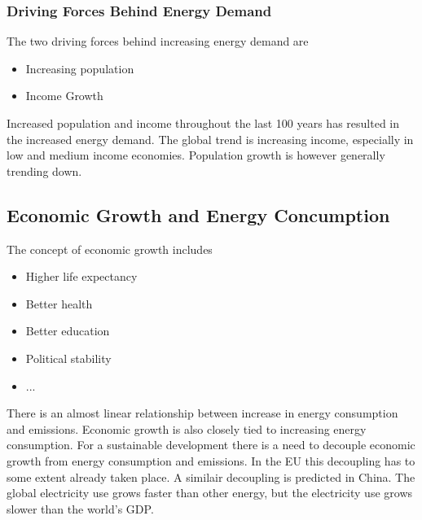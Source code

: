 \subsubsection{Driving Forces Behind Energy Demand}
The two driving forces behind increasing energy demand are

\begin{itemize}
    \item Increasing population
    \item Income Growth
\end{itemize}

Increased population and income throughout the last 100 years has resulted in the increased energy demand.
The global trend is increasing income, especially in low and medium income economies.
Population growth is however generally trending down.

\subsection{Economic Growth and Energy Concumption}
The concept of economic growth includes

\begin{itemize}
    \item Higher life expectancy
    \item Better health
    \item Better education
    \item Political stability
    \item ...
\end{itemize}

There is an almost linear relationship between increase in energy consumption and \cotwo emissions.
Economic growth is also closely tied to increasing energy consumption.
For a sustainable development there is a need to decouple economic growth from energy consumption and \cotwo emissions.
In the EU this decoupling has to some extent already taken place.
A similair decoupling is predicted in China.
The global electricity use grows faster than other energy, but the electricity use grows slower than the world's GDP.


